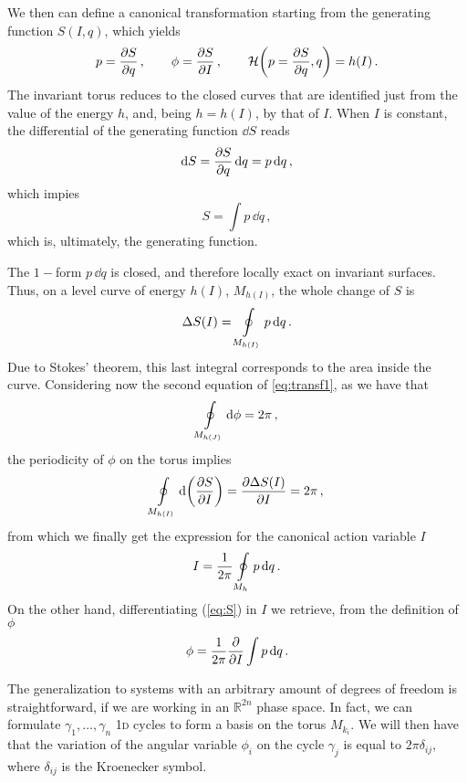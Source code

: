 We then can define a canonical transformation starting from the generating function $S(I,q)$, which yields
%
\begin{equation}
  p=\pdv{S}{q}\,, \qquad \phi=\pdv{S}{I}\,, \qquad \mathcal{H}\qty(p=\pdv{S}{q},q) = h(I)\,.
  \label{eq:transf1}
  \end{equation} 
%
The invariant torus reduces to the closed curves that are identified just from the value of the energy $h$, and, being $h=h(I)$, by that of $I$. When $I$ is constant, the differential of the generating function $\dd S$ reads
%
\begin{equation} 
    \dd S = \pdv{S}{q}\,\dd q = p\,\dd q\,,
\end{equation} 
%
which impies
%
\begin{equation}
    S = \int p\, \dd q\,,
    \label{eq:S}
\end{equation} 
%
which is, ultimately, the generating function.

The $1-$form $p\,\dd q$ is closed, and therefore locally exact on invariant surfaces. Thus, on a level curve of energy $h(I)$, $M_{h(I)}$, the whole change of $S$ is
%
\begin{equation}
    \Delta S(I) = \oint\displaylimits_{M_{h(I)}} p\, \dd q \,.
\end{equation} 
%
Due to Stokes' theorem, this last integral corresponds to the area inside the curve.  Considering now the second equation of \eqref{eq:transf1}, as we have that
%
\begin{equation} 
    \oint\displaylimits_{M_{h(J)}} \dd\phi = 2\pi\,,  
\end{equation} 
%
the periodicity of $\phi$ on the torus implies
%
\begin{equation} 
    \oint\displaylimits_{M_{h(I)}} \dd\qty(\pdv{S}{I}) = \pdv{\Delta S(I)}{I} = 2\pi\,, 
\end{equation}
%
from which we finally get the expression for the canonical action variable $I$
%
\begin{equation}  
    I = \frac{1}{2\pi}\oint\displaylimits_{M_h} p\,\dd q\,.  
\end{equation} 
%
On the other hand, differentiating (\ref{eq:S}) in $I$ we retrieve, from the definition of $\phi$
%
\begin{equation} 
    \phi = \frac{1}{2\pi} \pdv{I}\int p\,\dd q\, . 
\end{equation}  

The generalization to systems with an arbitrary amount of degrees of freedom is straightforward, if we are working in an $\mathbb{R}^{2n}$ phase space. In fact, we can formulate $\gamma_1,\dots, \gamma_n$ 1\textsc{d} cycles to form a basis on the torus $M_{k_i}$. We will then have that the variation of the angular variable $\phi_i$ on the cycle $\gamma_j$ is equal to $2\pi\delta_{ij}$, where $\delta_{ij}$ is the Kroenecker symbol.

